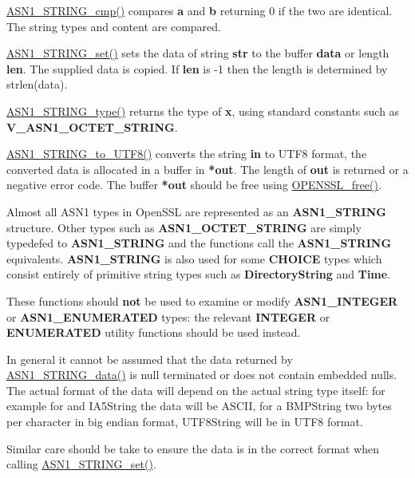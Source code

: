 \documentclass[]{article}
\let\realtextbf=\textbf
\renewcommand{\textbf}[1]{\textcolor{boldcolor}{\realtextbf{#1}}}
\renewcommand{\emph}[1]{\underline{#1}}
\begin{document}
\emph{ASN1\_STRING\_cmp()} compares \textbf{a} and \textbf{b} returning
0 if the two are identical. The string types and content are compared.

\emph{ASN1\_STRING\_set()} sets the data of string \textbf{str} to the
buffer \textbf{data} or length \textbf{len}. The supplied data is
copied. If \textbf{len} is -1 then the length is determined by
strlen(data).

\emph{ASN1\_STRING\_type()} returns the type of \textbf{x}, using
standard constants such as \textbf{V\_ASN1\_OCTET\_STRING}.

\emph{ASN1\_STRING\_to\_UTF8()} converts the string \textbf{in} to UTF8
format, the converted data is allocated in a buffer in \textbf{*out}.
The length of \textbf{out} is returned or a negative error code. The
buffer \textbf{*out} should be free using \emph{OPENSSL\_free()}.


Almost all ASN1 types in OpenSSL are represented as an
\textbf{ASN1\_STRING} structure. Other types such as
\textbf{ASN1\_OCTET\_STRING} are simply typedefed to
\textbf{ASN1\_STRING} and the functions call the \textbf{ASN1\_STRING}
equivalents. \textbf{ASN1\_STRING} is also used for some \textbf{CHOICE}
types which consist entirely of primitive string types such as
\textbf{DirectoryString} and \textbf{Time}.

These functions should \textbf{not} be used to examine or modify
\textbf{ASN1\_INTEGER} or \textbf{ASN1\_ENUMERATED} types: the relevant
\textbf{INTEGER} or \textbf{ENUMERATED} utility functions should be used
instead.

In general it cannot be assumed that the data returned by
\emph{ASN1\_STRING\_data()} is null terminated or does not contain
embedded nulls. The actual format of the data will depend on the actual
string type itself: for example for and IA5String the data will be
ASCII, for a BMPString two bytes per character in big endian format,
UTF8String will be in UTF8 format.

Similar care should be take to ensure the data is in the correct format
when calling \emph{ASN1\_STRING\_set()}.

\end{document}

